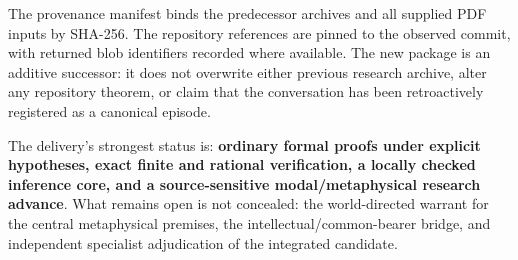\documentclass[11pt,a4paper]{article}
\begin{document}
The provenance manifest binds the predecessor archives and all supplied
PDF inputs by SHA-256. The repository references are pinned to the
observed commit, with returned blob identifiers recorded where
available. The new package is an additive successor: it does not
overwrite either previous research archive, alter any repository
theorem, or claim that the conversation has been retroactively
registered as a canonical episode.

The delivery's strongest status is: \textbf{ordinary formal proofs under
explicit hypotheses, exact finite and rational verification, a locally
checked inference core, and a source-sensitive modal/metaphysical
research advance}. What remains open is not concealed: the
world-directed warrant for the central metaphysical premises, the
intellectual/common-bearer bridge, and independent specialist
adjudication of the integrated candidate.
\end{document}
